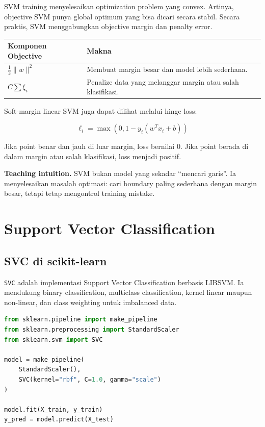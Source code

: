 \documentclass{article}
\newcommand{\code}[1]{\texttt{#1}}
\newcommand{\infobox}[2]{%
  \par\vspace{0.6em}
  \noindent\colorbox{#1}{%
    \begin{minipage}{0.96\textwidth}
    \vspace{0.65em}
    #2
    \vspace{0.65em}
    \end{minipage}}
  \par\vspace{0.8em}
}
\begin{document}
SVM training menyelesaikan optimization problem yang convex. Artinya, objective SVM punya global optimum yang bisa dicari secara stabil. Secara praktis, SVM menggabungkan objective margin dan penalty error.

\begin{table}[H]
\centering
{}
\begin{tabularx}{\textwidth}{>{\bfseries}lX}
\rowcolor{softGreen}
Komponen Objective & Makna \\
\toprule
$\frac{1}{2}\lVert w \rVert^2$ & Membuat margin besar dan model lebih sederhana. \\
$C\sum \xi_i$ & Penalize data yang melanggar margin atau salah klasifikasi. \\
\bottomrule
\end{tabularx}
\end{table}

Soft-margin linear SVM juga dapat dilihat melalui hinge loss:

\begin{equation}
\ell_i = \max(0, 1 - y_i(w^T x_i + b))
\end{equation}

Jika point benar dan jauh di luar margin, loss bernilai 0. Jika point berada di dalam margin atau salah klasifikasi, loss menjadi positif.

\infobox{softPurple}{\textbf{Teaching intuition.} SVM bukan model yang sekadar ``mencari garis''. Ia menyelesaikan masalah optimasi: cari boundary paling sederhana dengan margin besar, tetapi tetap mengontrol training mistake.}

\section{Support Vector Classification}

\subsection{SVC di scikit-learn}

\code{SVC} adalah implementasi Support Vector Classification berbasis LIBSVM. Ia mendukung binary classification, multiclass classification, kernel linear maupun non-linear, dan class weighting untuk imbalanced data.

\begin{lstlisting}[language=Python]
from sklearn.pipeline import make_pipeline
from sklearn.preprocessing import StandardScaler
from sklearn.svm import SVC

model = make_pipeline(
    StandardScaler(),
    SVC(kernel="rbf", C=1.0, gamma="scale")
)

model.fit(X_train, y_train)
y_pred = model.predict(X_test)
\end{lstlisting}
\end{document}
